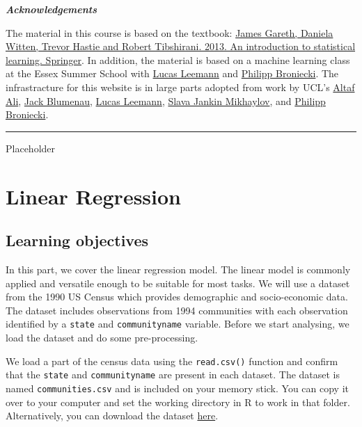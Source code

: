 \documentclass[]{article}
\begin{document}
\textbf{\emph{Acknowledgements}}

The material in this course is based on the textbook: \href{http://faculty.marshall.usc.edu/gareth-james/ISL/ISLR\%20Seventh\%20Printing.pdf}{James Gareth, Daniela Witten, Trevor Hastie and Robert Tibshirani. 2013. An introduction to statistical learning. Springer}. In addition, the material is based on a machine learning class at the Essex Summer School with \href{https://lucasleemann.ch}{Lucas Leemann} and \href{https://philippbroniecki.com}{Philipp Broniecki}. The infrastracture for this website is in large parts adopted from work by UCL's \href{https://iris.ucl.ac.uk/iris/browse/profile?upi=ALIAX58}{Altaf Ali}, \href{https://www.jackblumenau.com/}{Jack Blumenau}, \href{https://lucasleemann.ch}{Lucas Leemann}, \href{https://sjankin.com/}{Slava Jankin Mikhaylov}, and \href{https://www.philippbroniecki.com/}{Philipp Broniecki}.

\begin{center}\rule{0.5\linewidth}{\linethickness}\end{center}

Placeholder

\hypertarget{linear-regression}{%
\section{Linear Regression}\label{linear-regression}}

\hypertarget{learning-objectives}{%
\subsection{Learning objectives}\label{learning-objectives}}

In this part, we cover the linear regression model. The linear model is commonly applied and versatile enough to be suitable for most tasks. We will use a dataset from the 1990 US Census which provides demographic and socio-economic data. The dataset includes observations from 1994 communities with each observation identified by a \texttt{state} and \texttt{communityname} variable. Before we start analysing, we load the dataset and do some pre-processing.

We load a part of the census data using the \texttt{read.csv()} function and confirm that the \texttt{state} and \texttt{communityname} are present in each dataset. The dataset is named \texttt{communities.csv} and is included on your memory stick. You can copy it over to your computer and set the working directory in R to work in that folder. Alternatively, you can download the dataset \href{http://philippbroniecki.github.io/ML2017.io/data/communities.csv}{here}.
\end{document}
